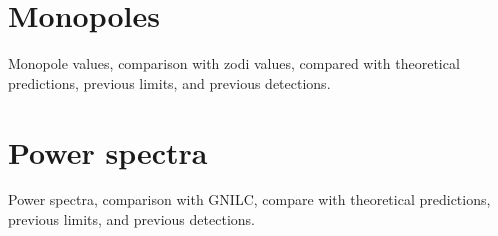 \documentclass{aa}
\newcommand{\m}[0]{\vec{m}}
\begin{document}


\section{Monopoles}


Monopole values, comparison with zodi values, compared with theoretical predictions, previous limits, and previous detections.

\section{Power spectra}

Power spectra, comparison with GNILC, compare with theoretical predictions, previous limits, and previous detections.
\end{document}
